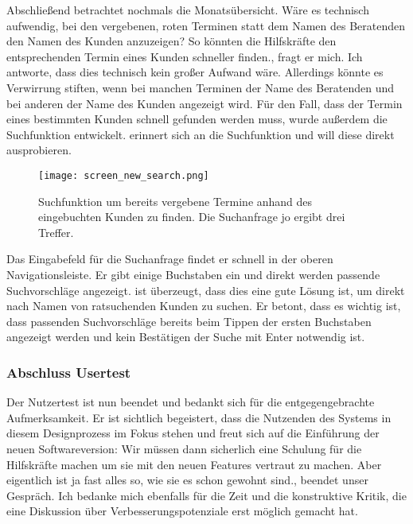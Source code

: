 Abschließend betrachtet \ipName nochmals die Monatsübersicht. \glqq{} Wäre es
technisch aufwendig, bei den vergebenen, roten Terminen statt dem Namen des
Beratenden den Namen des Kunden anzuzeigen? So könnten die Hilfskräfte den
entsprechenden Termin eines Kunden schneller finden.\grqq{}, fragt er mich. Ich
antworte, dass dies technisch kein großer Aufwand wäre. Allerdings könnte es
Verwirrung stiften, wenn bei manchen Terminen der Name des Beratenden und bei
anderen der Name des Kunden angezeigt wird. Für den Fall, dass der Termin eines
bestimmten Kunden schnell gefunden werden muss, wurde außerdem die Suchfunktion
entwickelt. \ipName erinnert sich an die Suchfunktion und will diese direkt
ausprobieren.

\begin{figure}[H]
    \caption{Suchfunktion um bereits vergebene Termine anhand des eingebuchten Kunden zu finden. Die Suchanfrage \glqq{}jo\grqq{} ergibt drei Treffer.}
    \centering
    \texttt{[image: screen\_new\_search.png]}
\end{figure}

Das Eingabefeld für die Suchanfrage findet er schnell in der oberen
Navigationsleiste. Er gibt einige Buchstaben ein und direkt werden passende
Suchvorschläge angezeigt. \ipName ist überzeugt, dass dies eine gute Lösung
ist, um direkt nach Namen von ratsuchenden Kunden zu suchen. Er betont, dass es
wichtig ist, dass passenden Suchvorschläge bereits beim Tippen der ersten
Buchstaben angezeigt werden und kein Bestätigen der Suche mit Enter notwendig
ist.

\subsubsection{Abschluss Usertest}
Der Nutzertest ist nun beendet und \ipName bedankt sich für die
entgegengebrachte Aufmerksamkeit. Er ist sichtlich begeistert, dass die
Nutzenden des Systems in diesem Designprozess im Fokus stehen und freut sich
auf die Einführung der neuen Softwareversion: \glqq{} Wir müssen dann
sicherlich eine Schulung für die Hilfskräfte machen um sie mit den neuen
Features vertraut zu machen. Aber eigentlich ist ja fast alles so, wie sie es
schon gewohnt sind.\grqq{}, beendet \ipName unser Gespräch. Ich bedanke mich
ebenfalls für die Zeit und die konstruktive Kritik, die eine Diskussion über
Verbesserungspotenziale erst möglich gemacht hat.
